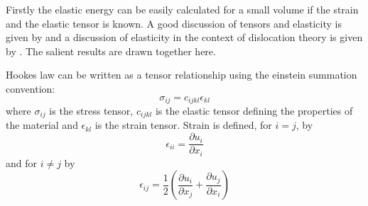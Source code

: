 Firstly the elastic energy can be easily calculated for a small volume if the strain and the elastic tensor is known. A good discussion of tensors and elasticity is given by \citet{kelly_knowles2012chapter5_tensors,kelly_knowles2012chapter6_stress_strain} and a discussion of elasticity in the context of dislocation theory is given by \citet{hirth_lothe1982elasticity}. The salient results are drawn together here.

Hookes law can be written as a tensor relationship using the einstein summation convention:
\begin{equation}
\sigma_{ij} = c_{ijkl} \epsilon_{kl}
\end{equation}
where $\sigma_{ij}$ is the stress tensor, $c_{ijkl}$ is the elastic tensor defining the properties of the material and $\epsilon_{kl}$ is the strain tensor. Strain is defined, for $i=j$, by
\begin{equation}
\epsilon_{ii} = \frac{\partial u_i}{\partial x_i}
\end{equation}
and for $i\neq j$ by
\begin{equation}
\epsilon_{ij} = \frac{1}{2} \left( \frac{\partial u_i}{\partial x_j} + \frac{\partial u_j}{\partial x_i} \right)
\end{equation}



